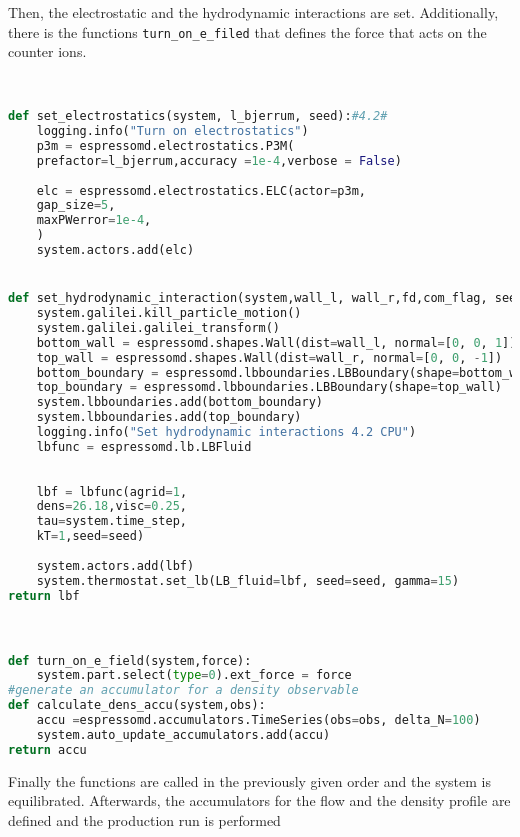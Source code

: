 Then, the electrostatic and the hydrodynamic interactions are set. Additionally, there is the functions \texttt{turn\_on\_e\_filed} that defines the force that acts on the counter ions.
\begin{lstlisting}[language=python]


def set_electrostatics(system, l_bjerrum, seed):#4.2#
	logging.info("Turn on electrostatics")
	p3m = espressomd.electrostatics.P3M(
	prefactor=l_bjerrum,accuracy =1e-4,verbose = False)
	
	elc = espressomd.electrostatics.ELC(actor=p3m,
	gap_size=5,
	maxPWerror=1e-4,
	)
	system.actors.add(elc)


def set_hydrodynamic_interaction(system,wall_l, wall_r,fd,com_flag, seed):#4.2
	system.galilei.kill_particle_motion()
	system.galilei.galilei_transform()
	bottom_wall = espressomd.shapes.Wall(dist=wall_l, normal=[0, 0, 1])
	top_wall = espressomd.shapes.Wall(dist=wall_r, normal=[0, 0, -1])
	bottom_boundary = espressomd.lbboundaries.LBBoundary(shape=bottom_wall)
	top_boundary = espressomd.lbboundaries.LBBoundary(shape=top_wall)
	system.lbboundaries.add(bottom_boundary)
	system.lbboundaries.add(top_boundary)
	logging.info("Set hydrodynamic interactions 4.2 CPU")
	lbfunc = espressomd.lb.LBFluid
	
	
	lbf = lbfunc(agrid=1,
	dens=26.18,visc=0.25,
	tau=system.time_step,
	kT=1,seed=seed)
	
	system.actors.add(lbf)
	system.thermostat.set_lb(LB_fluid=lbf, seed=seed, gamma=15)
return lbf



def turn_on_e_field(system,force):
	system.part.select(type=0).ext_force = force
#generate an accumulator for a density observable	
def calculate_dens_accu(system,obs):
	accu =espressomd.accumulators.TimeSeries(obs=obs, delta_N=100)
	system.auto_update_accumulators.add(accu)
return accu


\end{lstlisting}
Finally the functions are called in the previously given order and the system is equilibrated. Afterwards, the accumulators for the flow and the density profile are defined and the production run is performed
